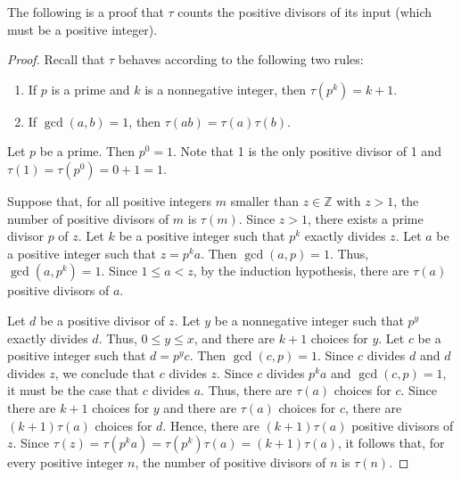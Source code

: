 \documentclass[12pt]{article}
\begin{document}
The following is a proof that $\tau$ counts the positive divisors of its input (which must be a positive integer).

\begin{proof}

Recall that $\tau$ behaves according to the following two rules:

\begin{enumerate}
\item If $p$ is a prime and $k$ is a nonnegative integer, then $\tau(p^k)=k+1$.
\item If $\gcd(a,b)=1$, then $\tau(ab)=\tau(a)\tau(b)$.
\end{enumerate}

Let $p$ be a prime.  Then $p^0=1$.  Note that 1 is the only positive divisor of 1 and $\tau(1)=\tau(p^0)=0+1=1$.

Suppose that, for all positive integers $m$ smaller than $z \in \mathbb{Z}$ with $z>1$, the number of positive divisors of $m$ is $\tau(m)$.  Since $z>1$, there exists a prime divisor $p$ of $z$.  Let $k$ be a positive integer such that $p^k$ exactly divides $z$.  Let $a$ be a positive integer such that $z=p^ka$.  Then $\gcd(a,p)=1$.  Thus, $\gcd(a,p^k)=1$.  Since $1\le a<z$, by the induction hypothesis, there are $\tau(a)$ positive divisors of $a$.

Let $d$ be a positive divisor of $z$.  Let $y$ be a nonnegative integer such that $p^y$ exactly divides $d$.  Thus, $0 \le y \le x$, and there are $k+1$ choices for $y$.  Let $c$ be a positive integer such that $d=p^yc$.  Then $\gcd(c,p)=1$.  Since $c$ divides $d$ and $d$ divides $z$, we conclude that $c$ divides $z$.  Since $c$ divides $p^ka$ and $\gcd(c,p)=1$, it must be the case that $c$ divides $a$.  Thus, there are $\tau(a)$ choices for $c$.  Since there are $k+1$ choices for $y$ and there are $\tau(a)$ choices for $c$, there are $(k+1)\tau(a)$ choices for $d$.  Hence, there are $(k+1)\tau(a)$ positive divisors of $z$.  Since $\tau(z)=\tau(p^ka)=\tau(p^k)\tau(a)=(k+1)\tau(a)$, it follows that, for every positive integer $n$, the number of positive divisors of $n$ is $\tau(n)$.
\end{proof}
\end{document}
